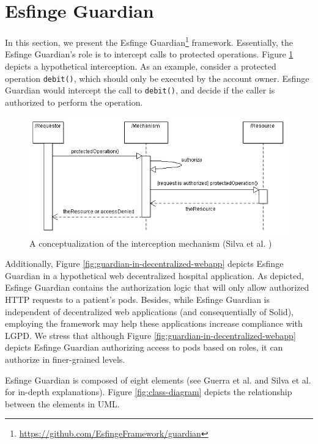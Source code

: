 \documentclass[sigconf]{acmart}
\begin{document}
\section{Esfinge Guardian}

In this section, we present the Esfinge Guardian\footnote{\url{https://github.com/EsfingeFramework/guardian}} framework. Essentially, the Esfinge Guardian's role is to intercept calls to protected operations. Figure \ref{fig:interception-mechanism} depicts a hypothetical interception. As an example, consider a protected operation \verb|debit()|, which should only be executed by the account owner. Esfinge Guardian would intercept the call to \verb|debit()|, and decide if the caller is authorized to perform the operation.

\begin{figure}
 \centering
 \includegraphics[scale=0.5]{img/interception-mechanism.png}
 \caption{A conceptualization of the interception mechanism (Silva et al. \cite{Silva2013})}
 \label{fig:interception-mechanism}
\end{figure}

Additionally, Figure \ref{fig:guardian-in-decentralized-webapp} depicts Esfinge Guardian in a hypothetical web decentralized hospital application. As depicted, Esfinge Guardian contains the authorization logic that will only allow authorized HTTP requests to a patient's pods. Besides, while Esfinge Guardian is independent of decentralized web applications (and consequentially of Solid), employing the framework may help these applications increase compliance with LGPD. We stress that although Figure \ref{fig:guardian-in-decentralized-webapp} depicts Esfinge Guardian authorizing access to pods based on roles, it can authorize in finer-grained levels.

Esfinge Guardian is composed of eight elements (see Guerra et al. \cite{Guerra2015} and Silva et al.\cite{Silva2013} for in-depth explanations). Figure \ref{fig:class-diagram} depicts the relationship between the elements in UML.
\end{document}
